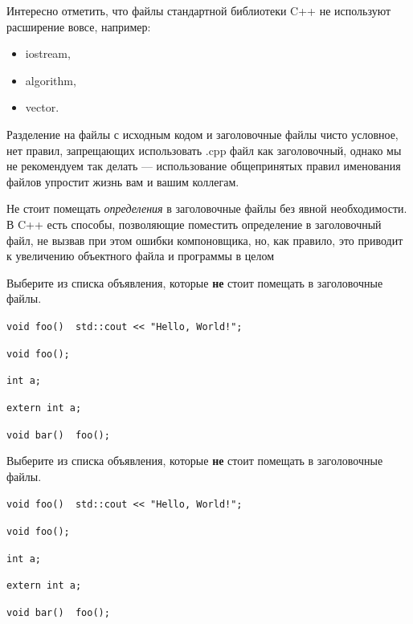 \documentclass[
    9pt,
    hyperref={pdfencoding=unicode}
    ]{beamer}
\begin{document}
\begin{frame}
    Интересно отметить, что файлы стандартной библиотеки C++ не используют расширение вовсе, например:
    \begin{itemize}
        \item iostream,
        \item algorithm,
        \item vector.
    \end{itemize}
    Разделение на файлы с исходным кодом и заголовочные файлы чисто условное, нет правил, запрещающих использовать .cpp файл как заголовочный, однако мы не рекомендуем так делать — использование общепринятых правил именования файлов упростит жизнь вам и вашим коллегам.
    
    Не стоит помещать \emph{определения} в заголовочные файлы без явной необходимости. В C++ есть способы, позволяющие поместить определение в заголовочный файл, не вызвав при этом ошибки компоновщика, но, как правило, это приводит к увеличению объектного файла и программы в целом
\end{frame}

\begin{frame}
    Выберите из списка объявления, которые \textbf{не} ﻿стоит помещать в заголовочные файлы.
    \begin{description}[align=left]
        \item[\Square] \texttt{void foo() { std::cout << "Hello, World!\n"; }}
        \item[\Square] \texttt{void foo();}
        \item[\Square] \texttt{int a;}
        \item[\Square] \texttt{extern int a;}
        \item[\Square] \texttt{void bar() { foo(); }}
    \end{description}
\end{frame}

\begin{frame}
    Выберите из списка объявления, которые \textbf{не} ﻿стоит помещать в заголовочные файлы.
    \begin{description}[align=left]
        \item[\XBox] \texttt{void foo() { std::cout << "Hello, World!\n"; }}
        \item[\Square] \texttt{void foo();}
        \item[\XBox] \texttt{int a;}
        \item[\Square] \texttt{extern int a;}
        \item[\XBox] \texttt{void bar() { foo(); }}
    \end{description}
\end{frame}
\end{document}
